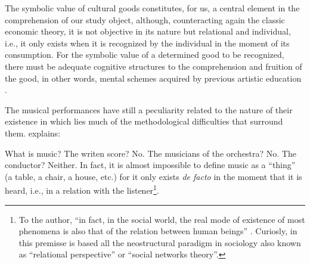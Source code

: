 \documentclass[a4paper, 12pt, openright, oneside, german, french, brazil, english, article]{abntex2}
\begin{document}
	The symbolic value of cultural goods constitutes, for us, a central element in the comprehension of our study object, although, counteracting again the classic economic theory, it is not objective in its nature but relational and individual, i.e., it only exists when it is recognized by the individual in the moment of its consumption. For the symbolic value of a determined good to be recognized, there must be adequate cognitive structures to the comprehension and fruition of the good, in other words, mental schemes acquired by previous artistic education \cite{bourdieu2003amor}.
	
	
	The musical performances have still a peculiarity related to the nature of their existence in which lies much of the methodological difficulties that surround them.  explains:
	
	\begin{citacao}
		What is music? The writen score? No. The musicians of the orchestra? No. The conductor? Neither. In fact, it is almost impossible to define music as a ``thing'' (a table, a chair, a house, etc.) for it only exists \textit{de facto} in the moment that it is heard, i.e., in a relation with the listener\footnote{To the author, ``in fact, in the social world, the real mode of existence of most phenomena is also that of the relation between human beings'' \cite[p. 110]{tolila2007cultura}. Curiosly, in this premisse is based all the neostructural paradigm in sociology also known as ``relational perspective'' or ``social networks theory''.}. \cite[p. 109]{tolila2007cultura}
	\end{citacao}
	
	
\end{document}
